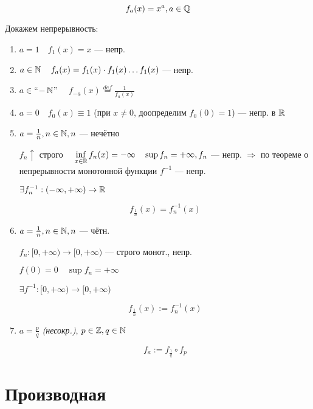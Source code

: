 $$f_a(x) = x^a, a\in\operatorname*{\mathbb{Q}}$$

Докажем непрерывность:
\begin{enumerate}
    \item $a=1 \quad f_1(x)=x$ --- непр.
    \item $a\in\operatorname*{\mathbb{N}} \quad f_a(x)=f_1(x)\cdot f_1(x)\ldots f_1(x)$ --- непр.
    \item $a\in$``$-\operatorname*{\mathbb{N}}$'' $\quad f_{-a}(x)\stackrel{def}{=}\frac{1}{f_a(x)}$
    \item $a=0 \quad f_0(x)\equiv 1$ (при $x\not=0$, доопределим $f_0(0)=1$) --- непр. в $\operatorname*{\mathbb{R}}$
    \item $a=\frac{1}{n}, n\in\operatorname*{\mathbb{N}}, n$ --- нечётно
    
    $f_n\uparrow$ строго $\quad \inf\limits_{x\in\operatorname*{\mathbb{R}}} f_n(x)=-\infty \quad \sup f_n=+\infty, f_n$ --- непр. $\Rightarrow$ по теореме о непрерывности монотонной функции $f^{-1}$ --- непр.

    $\exists f^{-1}_n:(-\infty, +\infty)\to\operatorname*{\mathbb{R}}$

    $$f_{\frac{1}{n}}(x)=f_n^{-1}(x)$$

    \item $a=\frac{1}{n}, n\in\operatorname*{\mathbb{N}}, n$ --- чётн.
    
    $f_n:[0, +\infty)\to[0,+\infty)$ --- строго монот., непр.

    $f(0)=0 \quad \sup f_n=+\infty$

    $\exists f^{-1} : [0, +\infty)\to[0, +\infty)$

    $$f_{\frac{1}{n}}(x):=f_n^{-1}(x)$$

    \item $a=\frac{p}{q}$ \textit{(несокр.)}, $p\in\operatorname*{\mathbb{Z}}, q\in\operatorname*{\mathbb{N}}$
    
    $$f_a:=f_\frac{1}{q}\circ f_p$$
\end{enumerate}

\section{Производная}

